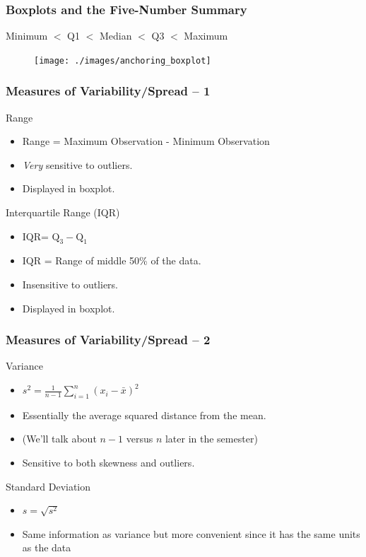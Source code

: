 \begin{frame}
\frametitle{Boxplots and the Five-Number Summary}
Minimum $<$ Q1 $<$ Median $<$ Q3 $<$ Maximum

\begin{figure}
\centering \texttt{[image: ./images/anchoring\_boxplot]}
\end{figure}

\end{frame}
\begin{frame}
\frametitle{Measures of Variability/Spread -- 1}

\begin{block}{Range}
  \begin{itemize}
    \item Range = Maximum Observation - Minimum Observation
    \item \emph{Very} sensitive to outliers. 
    \item Displayed in boxplot.
  \end{itemize}
\end{block}

\begin{block}{Interquartile Range (IQR)}
  \begin{itemize}
    \item IQR= $\mbox{Q}_3 - \mbox{Q}_1$
    \item IQR = Range of middle 50\% of the data. 
    \item Insensitive to outliers.  
    \item Displayed in boxplot.
  \end{itemize}
\end{block}
\end{frame}

\begin{frame}
\frametitle{Measures of Variability/Spread -- 2}
\begin{block}{Variance}
  \begin{itemize}
    \item $\displaystyle s^2 = \frac{1}{n-1} \sum_{i=1}^n (x_i - \bar{x})^2$
    \item Essentially the average squared distance from the mean. 
    \item (We'll talk about $n-1$ versus $n$ later in the semester)
    \item Sensitive to both skewness and outliers.
  \end{itemize}
\end{block}

 \begin{block}{Standard Deviation}
   \begin{itemize}
	    \item $s = \sqrt{s^2}$
      \item Same information as variance but more convenient since it has the \alert{same units as the data}
   \end{itemize}
\end{block}
\end{frame}

